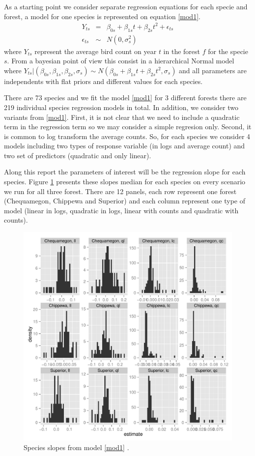 \documentclass{article}
\begin{document}
As a starting point we consider separate regression equations for each specie and forest, a model for one species is represented on equation \ref{mod1}. 
\begin{eqnarray}
\nonumber Y_{ts} &=&  \beta_{0s} + \beta_{1s}t + \beta_{2s}t^2 + \epsilon_{ts}  \\
\epsilon_{ts} &\sim& N(0,\sigma_{s}^2)
\label{mod1}
\end{eqnarray}
where $Y_{ts}$ represent the average bird count on year $t$ in the forest $f$ for the specie $s$. From a bayesian point of view this consist in a hierarchical Normal model where $Y_{ts}\vert (\beta_{0s},\beta_{1s},\beta_{2s},\sigma_{s}) \sim N(\beta_{0s}+\beta_{1s}t+\beta_{2s}t^2, \sigma_{s})$ and all parameters are independents with flat priors and different values for each species. 

There are 73 species and we fit the model \ref{mod1} for 3 different forests there are 219 individual species regression models in total. In addition, we consider two variants from \ref{mod1}. First, it is not clear that we need to include a quadratic term in the regression term so we may consider a simple regresion only. Second, it is common to log transform the average counts. So, for each species we consider 4 models including two types of response variable (in logs and average count) and two set of predictors (quadratic and only linear). 
 
Along this report the parameters of interest will be the regression slope for each species.  Figure \ref{histm1} presents these slopes median for each species on every scenario we run for all three forest. There are 12 panels, each row represent one forest (Chequamegon, Chippewa and Superior) and each column represent one type of model (linear in logs, quadratic in logs, linear with counts and quadratic with counts).  
\begin{figure}[h!]
\centering
\includegraphics[scale=.5, angle=-90]{hist_m1}
\caption{Species slopes from model \ref{mod1} . \label{histm1}}
\end{figure}
\end{document}
